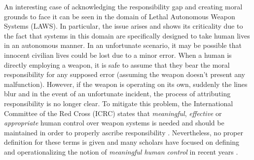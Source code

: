 An interesting case of acknowledging the responsibility gap and creating moral grounds to face it can be seen in the domain of Lethal Autonomous Weapon Systems (LAWS).
In particular, the issue arises and shows its criticality due to the fact that systems in this domain are specifically designed to take human lives in an autonomous manner.
In an unfortunate scenario, it may be possible that innocent civilian lives could be lost due to a minor error.
When a human is directly employing a weapon, it is safe to assume that they bear the moral responsibility for any supposed error (assuming the weapon doesn't present any malfunction).
However, if the weapon is operating on its own, suddenly the lines blur and in the event of an unfortunate incident, the process of attributing responsibility is no longer clear.
To mitigate this problem, the International Committee of the Red Cross (ICRC) states that \textit{meaningful}, \textit{effective} or \textit{appropriate} human control over weapon systems is needed and should be maintained in order to properly ascribe responsibility \parencite{ICRCEA}.
Nevertheless, no proper definition for these terms is given and many scholars have focused on defining and operationalizing the notion of \textit{meaningful human control} in recent years \parencite{VERAAC, EKEMBS}.
